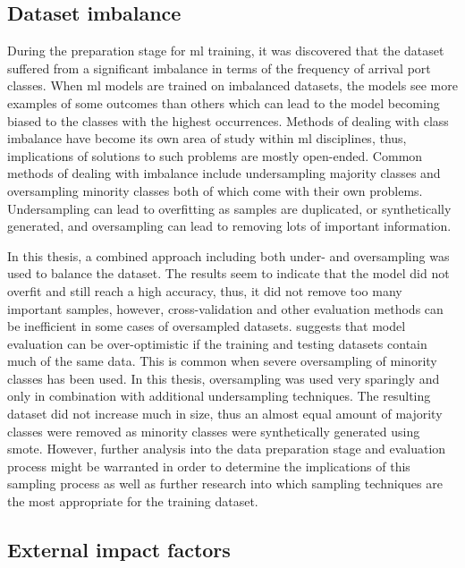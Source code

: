 \subsection{Dataset imbalance}

During the preparation stage for \acrshort{ml} training, it was discovered that the dataset suffered from a significant imbalance in terms of the frequency of arrival port classes. When \acrshort{ml} models are trained on imbalanced datasets, the models see more examples of some outcomes than others which can lead to the model becoming biased to the classes with the highest occurrences. Methods of dealing with class imbalance have become its own area of study within \acrshort{ml} disciplines, thus, implications of solutions to such problems are mostly open-ended. Common methods of dealing with imbalance include undersampling majority classes and oversampling minority classes both of which come with their own problems. Undersampling can lead to overfitting as samples are duplicated, or synthetically generated, and oversampling can lead to removing lots of important information.

In this thesis, a combined approach including both under- and oversampling was used to balance the dataset. The results seem to indicate that the model did not overfit and still reach a high accuracy, thus, it did not remove too many important samples, however, cross-validation and other evaluation methods can be inefficient in some cases of oversampled datasets. \cite{cv_imbalance} suggests that model evaluation can be over-optimistic if the training and testing datasets contain much of the same data. This is common when severe oversampling of minority classes has been used. In this thesis, oversampling was used very sparingly and only in combination with additional undersampling techniques. The resulting dataset did not increase much in size, thus an almost equal amount of majority classes were removed as minority classes were synthetically generated using \acrfull{smote}. However, further analysis into the data preparation stage and evaluation process might be warranted in order to determine the implications of this sampling process as well as further research into which sampling techniques are the most appropriate for the training dataset.

\subsection{External impact factors}

